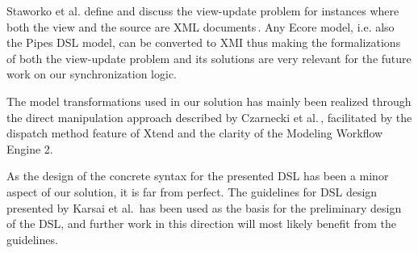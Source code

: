 Staworko et al. define and discuss the view-update problem for instances where both the view and the source are XML documents\,\cite{staworko10}. Any Ecore model, i.e. also the Pipes DSL model, can be converted to XMI thus making the formalizations of both the view-update problem and its solutions are very relevant for the future work on our synchronization logic.

The model transformations used in our solution has mainly been realized through the direct manipulation approach described by Czarnecki et al.\,\cite{czarnecki06}, facilitated by the dispatch method feature of Xtend and the clarity of the Modeling Workflow Engine 2.

As the design of the concrete syntax for the presented DSL has been a minor aspect of our solution, it is far from perfect. The guidelines for DSL design presented by Karsai et al.\,\cite{karsai09} has been used as the basis for the preliminary design of the DSL, and further work in this direction will most likely benefit from the guidelines.



